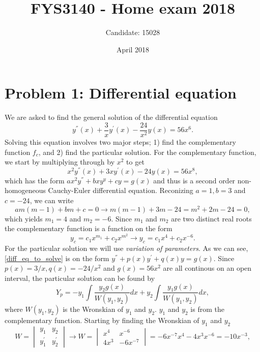 \documentclass{article}
\title{FYS3140 - Home exam 2018}
\author{Candidate: 15028}
\date{April 2018}
\begin{document}
\maketitle

\section*{Problem 1: Differential equation}

We are asked to find the general solution of the differential equation
\begin{equation}
y^{''}(x) + \frac{3}{x}y^{'}(x) - \frac{24}{x^2}y(x) = 56x^6. \label{diff_eq_to_solve}
\end{equation}
Solving this equation involves two major steps; 1) find the complementary function $f_c$, and 2) find the particular solution.
For the complementary function, we start by multiplying through by $x^2$ to get
\begin{equation}
x^2y^{''}(x) + 3xy^{'}(x) - 24y(x) = 56x^8,
\end{equation}
which has the form $ax^2y^{''} + bxy^{y} + cy = g(x)$ and thus is a second order non-homogeneous Cauchy-Euler differential equation.
Reconizing $a = 1, b = 3$ and $c = -24$, we can write 
\begin{equation}
am(m-1) + bm + c = 0 \rightarrow m(m-1) + 3m -24 = m^2 + 2m -24 = 0,
\end{equation}
which yields $m_1 = 4$ and $m_2 = -6$. Since $m_1$ and $m_2$ are two distinct real roots the complementary function is a function on the form
\begin{equation}
y_c = c_1x^{m_1} + c_2x^{m^2} \rightarrow y_c = c_1x^{4} + c_2x^{-6}.
\end{equation}
For the particular solution we will use \textit{variation of parameters}. As we can see, \ref{diff_eq_to_solve} is on the form $y^{''} + p(x)y^{'} + q(x)y = g(x)$. Since $p(x) = 3/x, q(x) = -24/x^2$ and $g(x) = 56x^2$ are all continous on an open interval, the particular solution can be found by
\begin{equation}
Y_p = -y_1\int \frac{y_2g(x)}{W(y_1,y_2)}dx + y_2\int \frac{y_1g(x)}{W(y_1, y_2)}dx,
\end{equation}
where $W(y_1, y_2)$ is the Wronskian of $y_1$ and $y_2$. $y_1$ and $y_2$ is from the complementary function. Starting by finding the Wronskian of $y_1$ and $y_2$
\begin{equation}
W = \begin{vmatrix}y_1&y_2\\y_1^{'}&y_2^{'}\end{vmatrix} \rightarrow W = \begin{vmatrix}x^4&x^{-6}\\4x^3&-6x^{-7}\end{vmatrix} = -6x^{-7}x^4 - 4x^3x^{-6} = -10x^{-3},
\end{equation}
\end{document}
